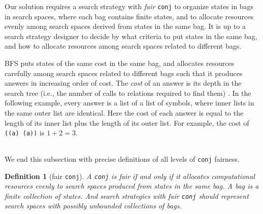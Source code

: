 \documentclass[format=acmlarge, review=true, authordraft=true]{acmart}
\newcommand{\conj}{\texttt{conj}}
\newcommand{\BFS}[0]{BFS}
\newtheorem{defn}{Definition}[section]
\begin{document}

\begin{center}
	\begin{tabular}{c}
		
	\end{tabular}
\end{center}

Our solution requires a search strategy with \emph{fair} \conj{} to organize
states in bags in search spaces, where each bag contains finite states, and 
to allocate resources evenly among search spaces derived from states in the 
same bag. It is up to a search strategy designer to decide by what criteria to 
put states in the same bag, and how to allocate resources among search spaces 
related to different bags.

\BFS{} puts states of the same cost in the same bag, and allocates
resources carefully among search spaces related to different bags such
that it produces answers in increasing order of cost. The \emph{cost}
of an answer is its depth in the search tree (i.e., the number of
calls to relations required to find them) \citep{seres1999algebra}. In
the following example, every answer is a list of a list of symbols,
where inner lists in the same outer list are identical. Here the cost of each 
answer is equal
to the length of its inner list plus the length of its outer list. For example,
the cost of \texttt{((a) (a))} is $1 + 2 = 3$.


\begin{center}
	\begin{tabular}{c}
		
	\end{tabular}
\end{center}

We end this subsection with precise definitions of all levels of \conj{} 
fairness.

\begin{defn}[fair \conj{}]
A \conj{} is fair if and only if it allocates computational resources evenly to 
search spaces produced from states in the same bag. A bag is a finite 
collection of states. And search strategies with fair \conj{} should represent 
search spaces with possibly unbounded collections of bags. 
\end{defn}
\end{document}
